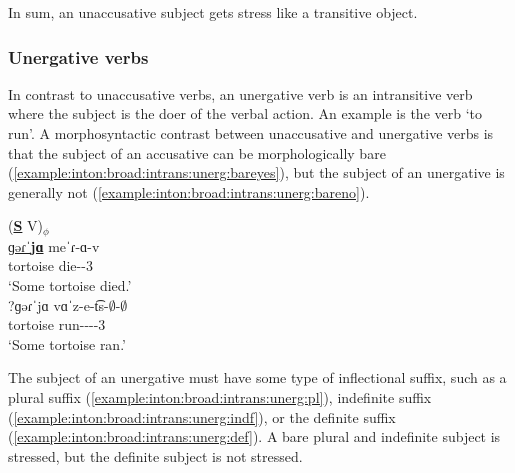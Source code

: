 In sum, an unaccusative subject gets stress like a transitive object. 
\subsubsection{Unergative verbs}\label{section:intonation:broadFocus:intrans:unerg}
In contrast to unaccusative verbs, an unergative verb is an intransitive verb where the subject is the doer of the verbal action. An example is the verb `to run'. A morphosyntactic contrast between unaccusative and unergative verbs is that the subject of an accusative can be morphologically bare (\ref{example:inton:broad:intrans:unerg:bareyes}), but the subject of an unergative is generally not (\ref{example:inton:broad:intrans:unerg:bareno}). 


\begin{exe}
	\ex \begin{xlist}
		\ex \glll (\textbf{\underline{S}} V)$_\phi$ \\
		\underline{ɡəɾˈ\textbf{jɑ}}  meˈɾ-ɑ-v \\
		tortoise die-{\pst}-3{\sg} \\
		\trans `Some tortoise died.'\label{example:inton:broad:intrans:unerg:bareyes}
		\\ 
		\ex \gll *?{ɡəɾˈ{jɑ}}  vɑˈz-e-t͡s-$\emptyset$-$\emptyset$ \\
		tortoise run-{\thgloss}-{\aorperf}-{\pst}-3{\sg} \\
		\trans `Some tortoise ran.'\label{example:inton:broad:intrans:unerg:bareno}
		\\ 
	\end{xlist}
\end{exe}

The subject of an unergative must have some type of inflectional suffix, such as a plural suffix (\ref{example:inton:broad:intrans:unerg:pl}), indefinite suffix  (\ref{example:inton:broad:intrans:unerg:indf}), or the definite suffix (\ref{example:inton:broad:intrans:unerg:def}). A bare plural and indefinite subject is stressed, but the definite subject is not stressed. 


